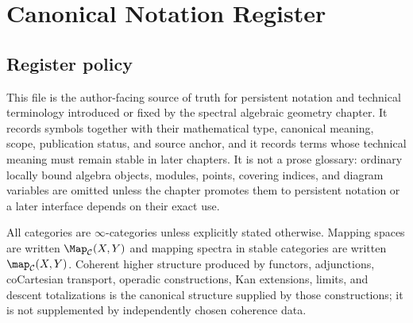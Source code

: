 \chapter*{Canonical Notation Register}

\begingroup

\small
\setlength{\LTleft}{0pt}
\setlength{\LTright}{0pt}
\setlength{\tabcolsep}{1.5pt}
\renewcommand{\arraystretch}{1.10}

\newcommand{\CanonicalRef}[1]{%
  \hyperref[#1]{\ref*{#1}, p.~\pageref*{#1}}%
}

\newcommand{\CanonicalEntry}[6]{%
  #1 & #2 & #3 & #4 & #5 & \CanonicalRef{#6}\\
}

\newcommand{\CanonicalLaw}[3]{%
  #1 & #2 & \CanonicalRef{#3}\\
}

\newcommand{\CanonicalOverload}[3]{%
  #1 & #2 & #3\\
}

\newcommand{\CanonicalTerm}[4]{%
  #1 & #2 & #3 & \CanonicalRef{#4}\\
}

\newcommand{\CanonicalTermOverload}[3]{%
  #1 & #2 & #3\\
}

\section*{Register policy}

This file is the author-facing source of truth for persistent notation and technical
terminology introduced or fixed by the spectral algebraic geometry chapter.  It records
symbols together with their mathematical type, canonical meaning, scope, publication
status, and source anchor, and it records terms whose technical meaning must remain stable
in later chapters.  It is not a prose glossary: ordinary locally bound algebra objects,
modules, points, covering indices, and diagram variables are omitted unless the chapter
promotes them to persistent notation or a later interface depends on their exact use.

All categories are $\infty$-categories unless explicitly stated otherwise.  Mapping spaces
are written $\Map_{\mathcal C}(X,Y)$ and mapping spectra in stable categories are written
$\map_{\mathcal C}(X,Y)$.  Coherent higher structure produced by functors, adjunctions,
coCartesian transport, operadic constructions, Kan extensions, limits, and descent
totalizations is the canonical structure supplied by those constructions; it is not
supplemented by independently chosen coherence data.

